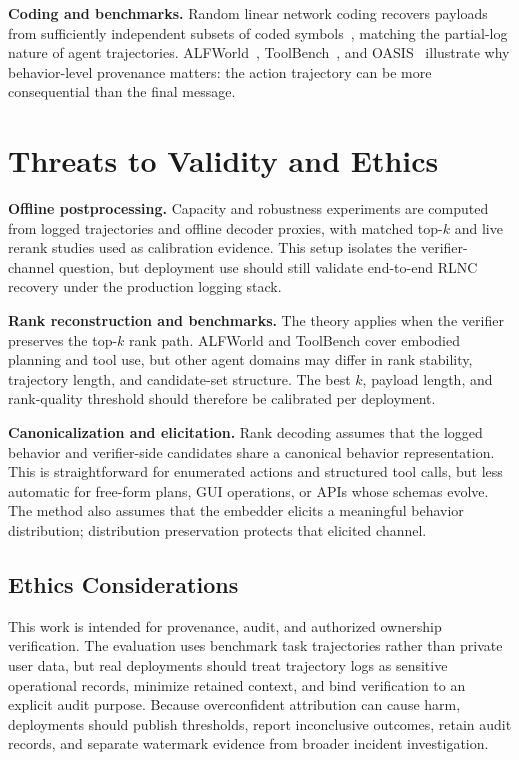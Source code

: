 \documentclass[conference,compsoc]{IEEEtran}
\begin{document}
\textbf{Coding and benchmarks.}
Random linear network coding recovers payloads from sufficiently independent subsets of coded symbols~\cite{ho2006random}, matching the partial-log nature of agent trajectories. ALFWorld~\cite{shridhar2021alfworld}, ToolBench~\cite{qin2023toolllm}, and OASIS~\cite{gao2024oasis} illustrate why behavior-level provenance matters: the action trajectory can be more consequential than the final message.

\section{Threats to Validity and Ethics}
\label{sec:validity}

\textbf{Offline postprocessing.}
Capacity and robustness experiments are computed from logged trajectories and offline decoder proxies, with matched top-$k$ and live rerank studies used as calibration evidence. This setup isolates the verifier-channel question, but deployment use should still validate end-to-end RLNC recovery under the production logging stack.

\textbf{Rank reconstruction and benchmarks.}
The theory applies when the verifier preserves the top-$k$ rank path. ALFWorld and ToolBench cover embodied planning and tool use, but other agent domains may differ in rank stability, trajectory length, and candidate-set structure. The best $k$, payload length, and rank-quality threshold should therefore be calibrated per deployment.

\textbf{Canonicalization and elicitation.}
Rank decoding assumes that the logged behavior and verifier-side candidates share a canonical behavior representation. This is straightforward for enumerated actions and structured tool calls, but less automatic for free-form plans, GUI operations, or APIs whose schemas evolve. The method also assumes that the embedder elicits a meaningful behavior distribution; distribution preservation protects that elicited channel.

\subsection{Ethics Considerations}

This work is intended for provenance, audit, and authorized ownership verification. The evaluation uses benchmark task trajectories rather than private user data, but real deployments should treat trajectory logs as sensitive operational records, minimize retained context, and bind verification to an explicit audit purpose. Because overconfident attribution can cause harm, deployments should publish thresholds, report inconclusive outcomes, retain audit records, and separate watermark evidence from broader incident investigation.
\end{document}
